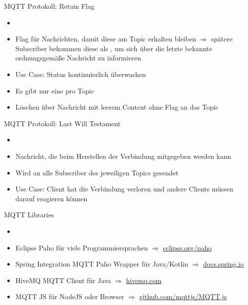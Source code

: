 \begin{frame}{MQTT Protokoll: Retain Flag}
      \begin{itemize}
        \setlength{\itemindent}{0.75in}
        \item [\textbf{Retain Flag}]
    \end{itemize}
    \begin{itemize}
        \item Flag für Nachrichten, damit diese am Topic erhalten bleiben $\Rightarrow$  spätere Subscriber bekommen diese als , um sich über die letzte bekannte ordnungsgemäße Nachricht zu informieren
        \item Use Case: Status kontinuierlich überwachen
        \item Es gibt nur eine pro Topic
        \item Löschen über Nachricht mit leerem Content ohne Flag an das Topic
     \end{itemize}
\end{frame}

\begin{frame}{MQTT Protokoll: Last Will Testament}
         \begin{itemize}
        \setlength{\itemindent}{1.2in}
        \item [\textbf{Last Will Testament}]
    \end{itemize}
    \begin{itemize}
        \item Nachricht, die beim Herstellen der Verbindung mitgegeben werden kann
         \item Wird an alle Subscriber des jeweiligen Topics gesendet
         \item Use Case: Client hat die Verbindung verloren und andere Clients müssen darauf reagieren können
    \end{itemize}
\end{frame}


\begin{frame}{MQTT Libraries}
              \begin{itemize}
        \setlength{\itemindent}{1.15in}
        \item [\textbf{Libraries für MQTT}]
    \end{itemize}
    \begin{itemize}
        \item Eclipse Paho für viele Programmiersprachen  $\Rightarrow$ \href{https://www.eclipse.org/paho/downloads.php}{eclipse.org/paho}
         \item Spring Integration MQTT Paho Wrapper für Java/Kotlin  $\Rightarrow$ \href{https://docs.spring.io/spring-integration/docs/5.2.1.RELEASE/reference/html/mqtt.html}{docs.spring.io}
         \item HiveMQ MQTT Client für Java  $\Rightarrow$ \href{https://www.hivemq.com/blog/mqtt-client-library-enyclopedia-hivemq-mqtt-client/}{hivemq.com}
         \item MQTT JS für NodeJS oder Browser $\Rightarrow$ \href{https://github.com/mqttjs/MQTT.js}{github.com/mqttjs/MQTT.js}
    \end{itemize}
\end{frame}

